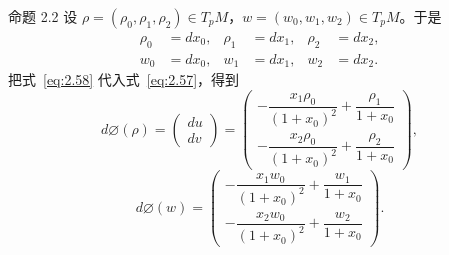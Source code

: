 \begin{statement}{命题 2.2}{}
设 $\rho=(\rho_0,\rho_1,\rho_2)\in T_pM$，$w=(w_0,w_1,w_2)\in T_pM$。于是
\begin{equation*}
  \begin{aligned}
    \rho_0&=dx_0,&\rho_1&=dx_1,&\rho_2&=dx_2,\\
    w_0&=dx_0,&w_1&=dx_1,&w_2&=dx_2.
  \end{aligned}
  \tag{2.58}\label{eq:2.58}
\end{equation*}
把式~\eqref{eq:2.58} 代入式~\eqref{eq:2.57}，得到
\begin{equation*}
  d\varnothing(\rho)=\begin{pmatrix}du\\dv\end{pmatrix}
  =\begin{pmatrix}
    -\dfrac{x_1\rho_0}{(1+x_0)^2}+\dfrac{\rho_1}{1+x_0}\\[5pt]
    -\dfrac{x_2\rho_0}{(1+x_0)^2}+\dfrac{\rho_2}{1+x_0}
  \end{pmatrix},
  \tag{2.59}\label{eq:2.59}
\end{equation*}
\begin{equation*}
  d\varnothing(w)
  =\begin{pmatrix}
    -\dfrac{x_1w_0}{(1+x_0)^2}+\dfrac{w_1}{1+x_0}\\[5pt]
    -\dfrac{x_2w_0}{(1+x_0)^2}+\dfrac{w_2}{1+x_0}
  \end{pmatrix}.
  \tag{2.60}\label{eq:2.60}
\end{equation*}


\end{statement}
